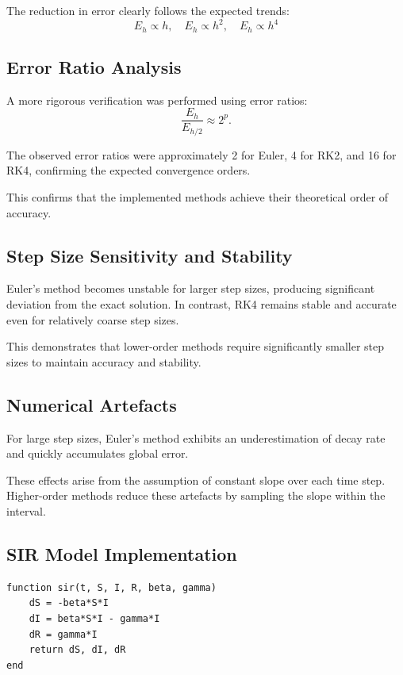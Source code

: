 \documentclass{article}
\begin{document}
The reduction in error clearly follows the expected trends:
\[
E_h \propto h, \quad E_h \propto h^2, \quad E_h \propto h^4
\]

\subsection{Error Ratio Analysis}

A more rigorous verification was performed using error ratios:
\[
\frac{E_h}{E_{h/2}} \approx 2^p.
\]

The observed error ratios were approximately 2 for Euler, 4 for RK2, and 16 for RK4, confirming the expected convergence orders.

This confirms that the implemented methods achieve their theoretical order of accuracy.

\subsection{Step Size Sensitivity and Stability}

Euler’s method becomes unstable for larger step sizes, producing significant deviation from the exact solution. In contrast, RK4 remains stable and accurate even for relatively coarse step sizes.

This demonstrates that lower-order methods require significantly smaller step sizes to maintain accuracy and stability.

\subsection{Numerical Artefacts}

For large step sizes, Euler’s method exhibits an underestimation of decay rate and quickly accumulates global error.

These effects arise from the assumption of constant slope over each time step. Higher-order methods reduce these artefacts by sampling the slope within the interval.

\subsection{SIR Model Implementation}

\begin{verbatim}
function sir(t, S, I, R, beta, gamma)
    dS = -beta*S*I
    dI = beta*S*I - gamma*I
    dR = gamma*I
    return dS, dI, dR
end
\end{verbatim}
\end{document}
